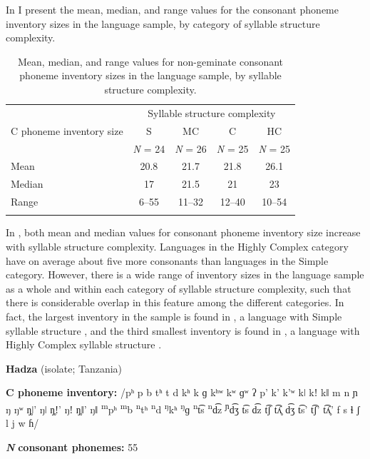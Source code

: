   In  I present the mean, median, and range values for the consonant phoneme inventory sizes in the language sample, by category of syllable structure complexity. 
  
\begin{table}
\begin{tabular}{lcccc}
\lsptoprule
 & \multicolumn{4}{c}{Syllable structure complexity}\\\cmidrule(lr){2-5}
C phoneme inventory size & S & MC & C & HC\\
     & \textit{N} = 24 & \textit{N} = 26 & \textit{N} = 25 & \textit{N} = 25\\\midrule
Mean & 20.8 & 21.7 & 21.8 & 26.1\\
Median & 17 & 21.5 & 21 & 23\\
Range & 6--55 & 11--32 & 12--40 & 10--54\\
\lspbottomrule
\end{tabular}
\caption{\label{tab:4.9}Mean, median, and range values for non-geminate consonant phoneme inventory sizes in the language sample, by syllable structure complexity.}
\end{table}

  In , both mean and median values for consonant phoneme inventory size increase with syllable structure complexity. Languages in the Highly Complex category have on average about five more consonants than languages in the Simple category. However, there is a wide range of inventory sizes in the language sample as a whole and within each category of syllable structure complexity, such that there is considerable overlap in this feature among the different categories. In fact, the largest inventory in the sample is found in , a language with Simple syllable structure , and the third smallest inventory is found in , a language with Highly Complex syllable structure .

\ea\label{ex:4.20}
   \textbf{Hadza} (isolate; Tanzania)

\textbf{C phoneme inventory:} /pʰ p b tʰ t d kʰ k ɡ kʰʷ kʷ ɡʷ ʔ p’ k’ k’ʷ kǀ kǃ kǁ m n ɲ ŋ ŋʷ ŋ̥ǀ’ ŋǀ ŋ̥ǃ’ ŋǃ ŋ̥ǁ’ ŋǁ \textsuperscript{m}pʰ \textsuperscript{m}b \textsuperscript{n}tʰ \textsuperscript{n}d \textsuperscript{ŋ}kʰ \textsuperscript{ŋ}ɡ \textsuperscript{n}t͡s \textsuperscript{n}d͡z \textsuperscript{ɲ}d͡ʒ t͡s d͡z t͡ʃ t͡ʎ̥ d͡ʒ t͡s’ t͡ʃ’ t͡ʎ̥’ f s ɬ ʃ l j w ɦ/

\textbf{\textit{N}} \textbf{consonant phonemes:} 55
\z

